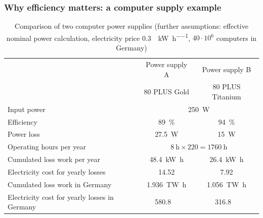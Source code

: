 \begin{frame}[c]
	\frametitle{Why efficiency matters: a computer supply example}
	\begin{table}
		\centering
		\begin{tabular}{lcc}
			\toprule
			& Power supply A & Power supply B \\
			& 80 PLUS Gold & 80 PLUS Titanium \\
			\midrule
			Input power & \multicolumn{2}{c}{\SI{250}{\watt}} \pause\\
			Efficiency & \SI{89}{\percent} & \SI{94}{\percent}  \pause\\
			Power loss & \SI{27.5}{\watt} & \SI{15}{\watt} \pause\\
			\midrule
			Operating hours per year & \multicolumn{2}{c}{$\SI{8}{\hour} \times 220 = \SI{1760}{\hour}$} \pause\\
			Cumulated loss work per year & \SI{48.4}{\kilo\watt\hour} & \SI{26.4}{\kilo\watt\hour} \pause\\
			Electricity cost for yearly losses & \SI{14.52}{\EUR} & \SI{7.92}{\EUR} \pause\\
			\midrule
			Cumulated loss work in Germany & \SI{1.936}{\tera\watt\hour} & \SI{1.056}{\tera\watt\hour} \pause\\
			Electricity cost for yearly losses in Germany & \SI{580.8}{\mega\EUR} & \SI{316.8}{\mega\EUR} \\
			\bottomrule
		\end{tabular}
		\label{tab:efficiency_computer_supply_example}
		\caption{Comparison of two computer power supplies (further assumptions: effective nominal power calculation, electricity price \SI[fraction-function=\nicefrac]{0.3}{\EUR\per\kilo\watt\per\hour}, $40\cdot 10^6$ computers in Germany)}
	\end{table}
\end{frame}

